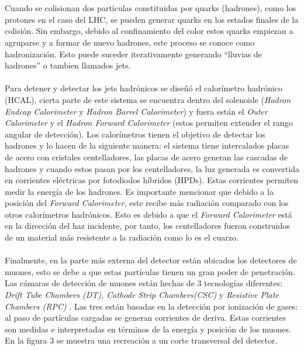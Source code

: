 \\
\\
Cuando se colisionan dos partículas constituidas por quarks (hadrones), como los protones en el caso del LHC, se pueden generar quarks en los estados finales de la colisión. Sin embargo, debido al confinamiento del color estos quarks empiezan a agruparse y a formar de nuevo hadrones, este proceso se conoce como hadronización. Esto puede suceder iterativamente generando ``lluvias de hadrones'' o tambien llamados jets.
\\
\\
Para detener y detectar los jets hadrónicos se diseñó el calorímetro hadrónico (HCAL), cierta parte de este sistema se encuentra dentro del solenoide (\textit{Hadron Endcap Calorimeter} y \textit{Hadron Barrel Calorimeter}) y fuera están el \textit{Outer Calorimeter} y el \textit{Hadron Forward Calorimeter} (estos permiten extender el rango angular de detección). Los calorímetros tienen el objetivo de detectar los hadrones y lo hacen de la siguiente manera: el sistema tiene intercalados placas de acero con cristales centelladores, las placas de acero generan las cascadas de hadrones y cuando estos pasan por los centelladores, la luz generada es convertida en corrientes eléctricas por fotodiodos híbridos (HPDs). Estas corrientes permiten medir la energía de los hadrones. Es importante mencionar que debido a la posición del \textit{Forward Calorimeter}, este recibe más radiación comparado con los otros calorímetros hadrónicos. Esto es debido a que el \textit{Forward Calorimeter} está en la dirección del haz incidente, por tanto, los centelladores fueron construidos de un material más resistente a la radiación como lo es el cuarzo.
\\
\\
Finalmente, en la parte más externa del detector están ubicados los detectores de muones, esto se debe a que estas partículas tienen un gran poder de penetración. Las cámaras de detección de muones están hechas de 3 tecnologías diferentes: \textit{Drift Tube Chambers (DT), Cathode Strip Chambers(CSC)} y \textit{Resistive Plate Chambers (RPC)}	. Las tres están basadas en la detección por ionización de gases: al paso de partículas cargadas se generan corrientes de deriva. Estas corrientes son medidas e interpretadas en términos de la energía y posición de los muones. En la figura 3 se muestra una recreación a un corte transversal del detector.
